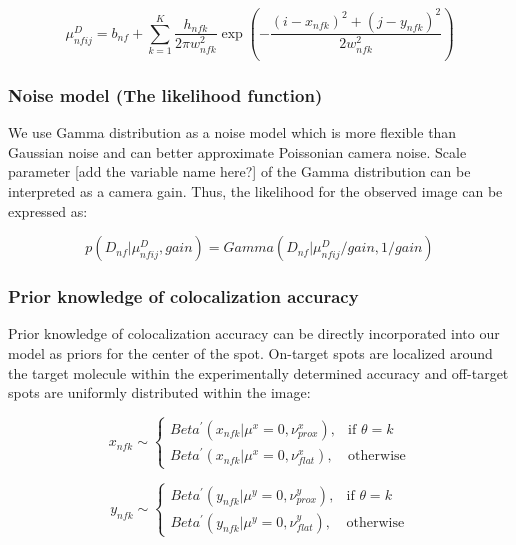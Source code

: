 \textbf{\begin{equation*}
    \mu^{D}_{nfij} = b_{nf} + \sum_{k=1}^{K} \dfrac{h_{nfk}}{2 \pi w^2_{nfk}} \exp{\left ( -\dfrac{(i-x_{nfk})^2 + (j-y_{nfk})^2}{2w^2_{nfk}} \right)}
\end{equation*}}

\subsubsection{Noise model (The likelihood function)}

 We use Gamma distribution as a noise model which is more flexible than Gaussian noise and can better approximate Poissonian camera noise. Scale parameter [add the variable name here?] of the Gamma distribution can be interpreted as a camera gain. Thus, the likelihood for the observed image can be expressed as:
 
 \begin{equation*}
     p(D_{nf}|\mu^D_{nfij},gain) = Gamma(D_{nf}|\mu^D_{nfij}/gain,1/gain)
 \end{equation*}

\subsubsection{Prior knowledge of colocalization accuracy}

Prior knowledge of colocalization accuracy can be directly incorporated into our model as priors for the center of the spot. On-target spots are localized around the target molecule within the experimentally determined accuracy and off-target spots are uniformly distributed within the image:

\begin{equation*}
    x_{nfk} \sim
\begin{cases}
    Beta^{\prime}(x_{nfk}|\mu^x=0,\nu^x_{prox}),& \text{if } \theta = k\\
    Beta^{\prime}(x_{nfk}|\mu^x=0,\nu^x_{flat}),& \text{otherwise}
\end{cases}
\end{equation*}

\begin{equation*}
    y_{nfk} \sim
\begin{cases}
    Beta^{\prime}(y_{nfk}|\mu^y=0,\nu^y_{prox}),& \text{if } \theta = k\\
    Beta^{\prime}(y_{nfk}|\mu^y=0,\nu^y_{flat}),& \text{otherwise}
\end{cases}
\end{equation*}


